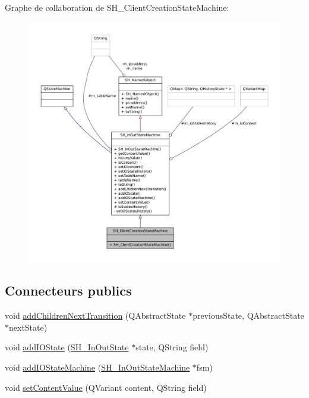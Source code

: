 Graphe de collaboration de S\-H\-\_\-\-Client\-Creation\-State\-Machine\-:\nopagebreak
\begin{figure}[H]
\begin{center}
\leavevmode
\includegraphics[width=350pt]{classSH__ClientCreationStateMachine__coll__graph}
\end{center}
\end{figure}
\subsection*{Connecteurs publics}
\begin{DoxyCompactItemize}
\item 
void \hyperlink{classSH__InOutStateMachine_a689e5513ef6ef3fc1598efacd413372e}{add\-Children\-Next\-Transition} (Q\-Abstract\-State $\ast$previous\-State, Q\-Abstract\-State $\ast$next\-State)
\item 
void \hyperlink{classSH__InOutStateMachine_ad6b778d052f741daee720c047059ce0e}{add\-I\-O\-State} (\hyperlink{classSH__InOutState}{S\-H\-\_\-\-In\-Out\-State} $\ast$state, Q\-String field)
\item 
void \hyperlink{classSH__InOutStateMachine_a56954869252c7f1980abf37df9919b5e}{add\-I\-O\-State\-Machine} (\hyperlink{classSH__InOutStateMachine}{S\-H\-\_\-\-In\-Out\-State\-Machine} $\ast$fsm)
\item 
void \hyperlink{classSH__InOutStateMachine_aa2766b7a7ba39c35a10df7fc0c151b4f}{set\-Content\-Value} (Q\-Variant content, Q\-String field)
\end{DoxyCompactItemize}
